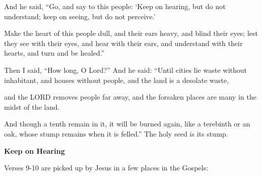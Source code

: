 \documentclass[11pt]{article}
\begin{document}
\newpage
\begin{biblicaloutline}[Isaiah 6:9-13]
    

    \begin{versesection}{2em}
         And he said, ``Go, and say to this people: `Keep on hearing, but do not understand; keep on seeing, but do not perceive.'

         Make the heart of this people dull, and their ears heavy, and blind their eyes; lest they see with their eyes, and hear with their ears, and understand with their hearts, and turn and be healed.''
    \end{versesection}
    
    
    \begin{versesection}{2em}
         Then I said, ``How long, O Lord?'' And he said: ``Until cities lie waste without inhabitant, and houses without people, and the land is a desolate waste,

         and the LORD removes people far away, and the forsaken places are many in the midst of the land.

         And though a tenth remain in it, it will be burned again, like a terebinth or an oak, whose stump remains when it is felled.'' The holy seed is its stump.
    \end{versesection}

\end{biblicaloutline}


{\large\bfseries Keep on Hearing}

{\vspace{1em}}

Verses 9-10 are picked up by Jesus in a few places in the Gospels:

{\vspace{1em}}
\end{document}
